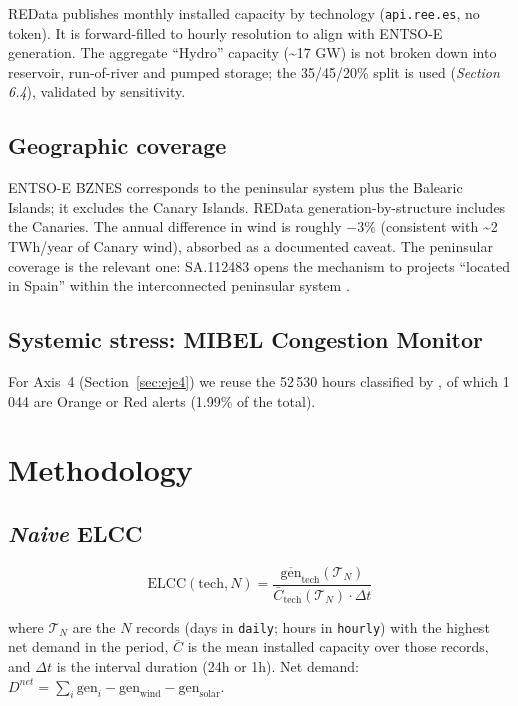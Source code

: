 \documentclass[11pt,a4paper]{article}
\begin{document}
REData publishes monthly installed capacity by technology (\texttt{api.ree.es}, no
token). It is forward-filled to hourly resolution to align with ENTSO-E
generation. The aggregate ``Hydro'' capacity (\textasciitilde17 GW) is not broken
down into reservoir, run-of-river and pumped storage; the 35/45/20\% split is used
(\emph{Section 6.4}), validated by sensitivity.

\subsection{Geographic coverage}

ENTSO-E BZN\textbar ES corresponds to the peninsular system plus the Balearic
Islands; it excludes the Canary Islands. REData generation-by-structure includes
the Canaries. The annual difference in wind is roughly $-3\%$ (consistent with
\textasciitilde2 TWh/year of Canary wind), absorbed as a documented caveat. The
peninsular coverage is the relevant one: SA.112483 opens the mechanism to projects
``located in Spain'' within the interconnected peninsular system
\citep{ec2026sa112483}.

\subsection{Systemic stress: MIBEL Congestion Monitor}

For Axis~4 (Section~\ref{sec:eje4}) we reuse the 52\,530 hours classified by
\citet{vilches2024mibel}, of which 1\,044 are Orange or Red alerts (1.99\% of the
total).

\section{Methodology}
\label{sec:method}

\subsection{\emph{Naive} ELCC}

\begin{equation}
\text{ELCC}(\text{tech}, N) = \frac{\overline{\text{gen}}_{\text{tech}}(\mathcal{T}_N)}{\bar{C}_{\text{tech}}(\mathcal{T}_N)\cdot \Delta t}
\label{eq:elcc}
\end{equation}

where $\mathcal{T}_N$ are the $N$ records (days in \texttt{daily}; hours in
\texttt{hourly}) with the highest net demand in the period, $\bar{C}$ is the mean
installed capacity over those records, and $\Delta t$ is the interval duration
(24h or 1h). Net demand:
$D^{net} = \sum_i \text{gen}_i - \text{gen}_{\text{wind}} - \text{gen}_{\text{solar}}$.
\end{document}
